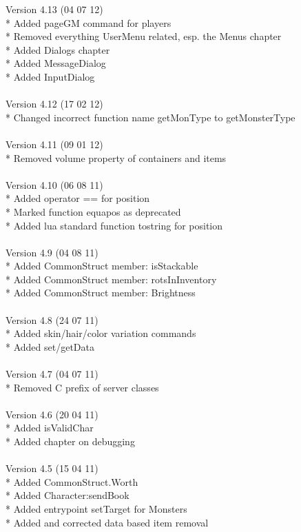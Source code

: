 \documentclass[a4paper,10pt,makeidx]{scrreprt}
\begin{document}
Version 4.13 (04 07 12)\\
* Added pageGM command for players\\
* Removed everything UserMenu related, esp. the Menus chapter\\
* Added Dialogs chapter\\
* Added MessageDialog\\
* Added InputDialog\\
\\
Version 4.12 (17 02 12)\\
* Changed incorrect function name getMonType to getMonsterType\\
\\
Version 4.11 (09 01 12)\\
* Removed volume property of containers and items\\
\\
Version 4.10 (06 08 11)\\
* Added operator == for position\\
* Marked function equapos as deprecated\\
* Added lua standard function tostring for position\\
\\
Version 4.9 (04 08 11)\\
* Added CommonStruct member: isStackable\\
* Added CommonStruct member: rotsInInventory\\
* Added CommonStruct member: Brightness\\
\\
Version 4.8 (24 07 11)\\
* Added skin/hair/color variation commands\\
* Added set/getData\\
\\
Version 4.7 (04 07 11)\\
* Removed C prefix of server classes\\
\\
Version 4.6 (20 04 11)\\
* Added isValidChar\\
* Added chapter on debugging\\
\\
Version 4.5 (15 04 11)\\
* Added CommonStruct.Worth\\
* Added Character:sendBook\\
* Added entrypoint setTarget for Monsters\\
* Added and corrected data based item removal\\
\end{document}
